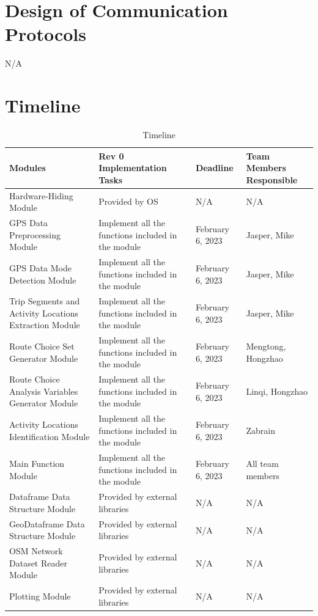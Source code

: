 \documentclass[12pt, titlepage]{article}
\begin{document}
\section{Design of Communication Protocols}
N/A

\newpage
\section{Timeline}
\begin{table}[h!]
    \centering
    \begin{tabular}{|>{\raggedright}p{}|p{}|p{}|p{}|}
    \hline
    \textbf{Modules} & \textbf{Rev 0 Implementation Tasks} & \textbf{Deadline} & \textbf{Team Members Responsible}\\
    \hline
     Hardware-Hiding Module & Provided by OS & N/A & N/A\\
    \hline
     GPS Data Preprocessing Module & Implement all the functions included in the module & February 6, 2023 & Jasper, Mike\\
    \hline
     GPS Data Mode Detection Module & Implement all the functions included in the module & February 6, 2023 & Jasper, Mike\\
    \hline
     Trip Segments and Activity Locations Extraction Module & Implement all the functions included in the module & February 6, 2023 & Jasper, Mike\\
    \hline
     Route Choice Set Generator Module & Implement all the functions included in the module & February 6, 2023 & Mengtong, Hongzhao\\
    \hline
     Route Choice Analysis Variables Generator Module & Implement all the functions included in the module & February 6, 2023 & Linqi, Hongzhao\\
    \hline
     Activity Locations Identification Module & Implement all the functions included in the module & February 6, 2023 & Zabrain\\
    \hline
     Main Function Module & Implement all the functions included in the module & February 6, 2023 & All team members\\
    \hline
     Dataframe Data Structure Module & Provided by external libraries & N/A & N/A\\
    \hline
     GeoDataframe Data Structure Module & Provided by external libraries & N/A & N/A\\
    \hline
     OSM Network Dataset Reader Module & Provided by external libraries & N/A & N/A\\
    \hline
     Plotting Module & Provided by external libraries & N/A & N/A\\
    \hline
    \end{tabular}
    \caption{Timeline}
    \label{tab:timeline}
\end{table}
\end{document}
